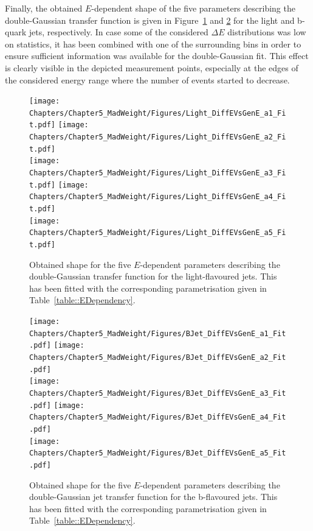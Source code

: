 Finally, the obtained $E$-dependent shape of the five parameters describing the double-Gaussian transfer function is given in Figure~\ref{fig::TFLight} and \ref{fig::TFBJet} for the light and b-quark jets, respectively. In case some of the considered $\Delta E$ distributions was low on statistics, it has been combined with one of the surrounding bins in order to ensure sufficient information was available for the double-Gaussian fit.
This effect is clearly visible in the depicted measurement points, especially at the edges of the considered energy range where the number of events started to decrease.

\begin{figure}[h!tp]
 \centering
 \texttt{[image: Chapters/Chapter5\_MadWeight/Figures/Light\_DiffEVsGenE\_a1\_Fit.pdf]} \hspace{0.2cm}
 \texttt{[image: Chapters/Chapter5\_MadWeight/Figures/Light\_DiffEVsGenE\_a2\_Fit.pdf]} \vspace{0.3cm} \\
 \texttt{[image: Chapters/Chapter5\_MadWeight/Figures/Light\_DiffEVsGenE\_a3\_Fit.pdf]} \hspace{0.2cm}
 \texttt{[image: Chapters/Chapter5\_MadWeight/Figures/Light\_DiffEVsGenE\_a4\_Fit.pdf]} \vspace{0.3cm} \\
 \texttt{[image: Chapters/Chapter5\_MadWeight/Figures/Light\_DiffEVsGenE\_a5\_Fit.pdf]}
 \caption{Obtained shape for the five $E$-dependent parameters describing the double-Gaussian transfer function for the light-flavoured jets. This has been fitted with the corresponding parametrisation given in Table~\ref{table::EDependency}.} \label{fig::TFLight}
\end{figure}

\begin{figure}[h!tp]
 \centering
 \texttt{[image: Chapters/Chapter5\_MadWeight/Figures/BJet\_DiffEVsGenE\_a1\_Fit.pdf]} \hspace{0.2cm}
 \texttt{[image: Chapters/Chapter5\_MadWeight/Figures/BJet\_DiffEVsGenE\_a2\_Fit.pdf]} \vspace{0.2cm} \\
 \texttt{[image: Chapters/Chapter5\_MadWeight/Figures/BJet\_DiffEVsGenE\_a3\_Fit.pdf]} \hspace{0.2cm}
 \texttt{[image: Chapters/Chapter5\_MadWeight/Figures/BJet\_DiffEVsGenE\_a4\_Fit.pdf]} \vspace{0.2cm} \\
 \texttt{[image: Chapters/Chapter5\_MadWeight/Figures/BJet\_DiffEVsGenE\_a5\_Fit.pdf]}
 \caption{Obtained shape for the five $E$-dependent parameters describing the double-Gaussian jet transfer function for the b-flavoured jets. This has been fitted with the corresponding parametrisation given in Table~\ref{table::EDependency}.} \label{fig::TFBJet}
\end{figure}

